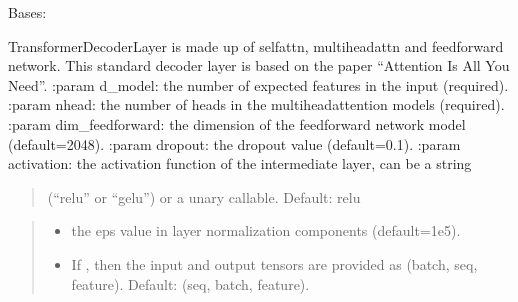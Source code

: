 \documentclass[letterpaper,10pt,english]{sphinxmanual}
\begin{document}
\begin{fulllineitems}
\label{\detokenize{beyondml.pt.layers:beyondml.pt.layers.MaskedTransformerDecoderLayer.MaskedTransformerDecoderLayer}}
\pysigstartsignatures
{}
\pysigstopsignatures
\sphinxAtStartPar
Bases: 

\sphinxAtStartPar
TransformerDecoderLayer is made up of self\sphinxhyphen{}attn, multi\sphinxhyphen{}head\sphinxhyphen{}attn and feedforward network.
This standard decoder layer is based on the paper “Attention Is All You Need”.
:param d\_model: the number of expected features in the input (required).
:param nhead: the number of heads in the multiheadattention models (required).
:param dim\_feedforward: the dimension of the feedforward network model (default=2048).
:param dropout: the dropout value (default=0.1).
:param activation: the activation function of the intermediate layer, can be a string
\begin{quote}

\sphinxAtStartPar
(“relu” or “gelu”) or a unary callable. Default: relu
\end{quote}
\begin{quote}\begin{description}
\begin{itemize}
\item {} 
\sphinxAtStartPar
{} \textendash{} the eps value in layer normalization components (default=1e\sphinxhyphen{}5).

\item {} 
\sphinxAtStartPar
{} \textendash{} If , then the input and output tensors are provided
as (batch, seq, feature). Default:  (seq, batch, feature).


\end{itemize}
\end{description}
\end{quote}
\end{fulllineitems}
\end{document}

